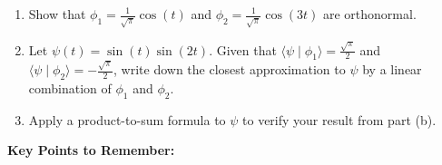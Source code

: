 \documentclass{article}
\begin{document}
\begin{enumerate}
		\begin{enumerate}
			\item Show that $\phi_1=\frac{1}{\sqrt{\pi}}\cos(t)$ and $\phi_2=\frac{1}{\sqrt{\pi}}\cos(3t)$ are orthonormal.
			\item Let $\psi(t)=\sin(t)\sin(2t)$. Given that $\langle\psi\mid\phi_1\rangle = \frac{\sqrt{\pi}}{2}$ and $\langle\psi\mid\phi_2\rangle=-\frac{\sqrt{\pi}}{2}$, write down the closest approximation to $\psi$ by a linear combination of $\phi_1$ and $\phi_2$.
			\item Apply a product-to-sum formula to $\psi$ to verify your result from part (b).
		\end{enumerate}
\end{enumerate}


















\clearpage




{\bf Key Points to Remember:}

\vspace{5mm}
\end{document}
